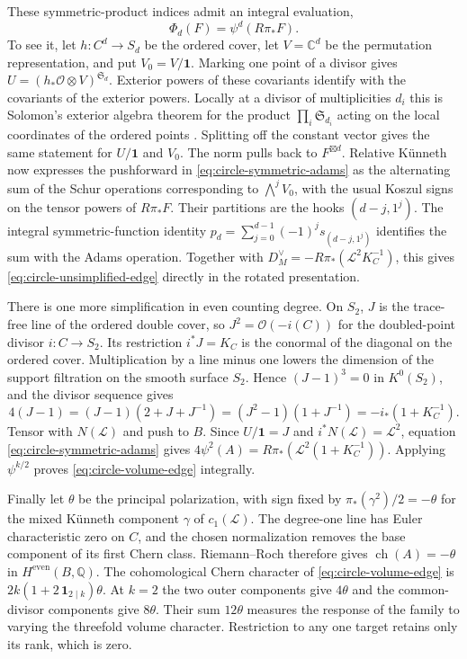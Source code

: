 These symmetric-product indices admit an integral evaluation,
\begin{equation}
 \Phi_d(F)=\psi^d(R\pi_*F).
 \label{eq:circle-symmetric-adams}
\end{equation}
To see it, let \(h:C^d\to S_d\) be the ordered cover, let
\(V=\mathbb C^d\) be the permutation representation, and put
\(V_0=V/\mathbf1\). Marking one point of a divisor gives
\(U=(h_*\mathcal O\otimes V)^{\mathfrak S_d}\).
Exterior powers of these covariants identify with the covariants of
the exterior powers. Locally at a divisor of multiplicities \(d_i\)
this is Solomon's exterior algebra theorem for the product
\(\prod_i\mathfrak S_{d_i}\) acting on the local coordinates of the
ordered points \cite{solomon}. Splitting off the constant vector
gives the same statement for \(U/\mathbf1\) and \(V_0\).
The norm pulls back to \(F^{\boxtimes d}\). Relative K\"unneth now
expresses the pushforward in \eqref{eq:circle-symmetric-adams}
as the alternating sum of the Schur operations corresponding to
\(\bigwedge^jV_0\), with the usual Koszul signs on the tensor powers
of \(R\pi_*F\). Their partitions are the hooks \((d-j,1^j)\).
The integral symmetric-function identity
\(p_d=\sum_{j=0}^{d-1}(-1)^j s_{(d-j,1^j)}\)
identifies the sum with the Adams operation. Together with
\(D_M^\vee=-R\pi_*(\mathcal L^2K_C^{-1})\), this gives
\eqref{eq:circle-unsimplified-edge} directly in the rotated
presentation.

There is one more simplification in even counting degree. On
\(S_2\), \(J\) is the trace-free line of the ordered double cover,
so \(J^2=\mathcal O(-i(C))\) for the doubled-point divisor
\(i:C\to S_2\). Its restriction \(i^*J=K_C\) is the conormal
of the diagonal on the ordered cover. Multiplication by a line
minus one lowers the dimension of the support filtration on the
smooth surface \(S_2\). Hence \((J-1)^3=0\) in \(K^0(S_2)\), and
the divisor sequence gives
\[
 4(J-1)=(J-1)(2+J+J^{-1})
        =(J^2-1)(1+J^{-1})=-i_*(1+K_C^{-1}).
\]
Tensor with \(N(\mathcal L)\) and push to \(B\). Since \(U/\mathbf1=J\)
and \(i^*N(\mathcal L)=\mathcal L^2\), equation
\eqref{eq:circle-symmetric-adams} gives
\(4\psi^2(A)=R\pi_*(\mathcal L^2(1+K_C^{-1}))\).
Applying \(\psi^{k/2}\) proves \eqref{eq:circle-volume-edge}
integrally.

Finally let \(\theta\) be the principal polarization, with sign
fixed by \(\pi_*(\gamma^2)/2=-\theta\) for the mixed K\"unneth
component \(\gamma\) of \(c_1(\mathcal L)\). The degree-one line has
Euler characteristic zero on \(C\), and the chosen normalization
removes the base component of its first Chern class. Riemann--Roch
therefore gives \(\operatorname{ch}(A)=-\theta\) in \(H^{\mathrm{even}}(B,\mathbb Q)\). The cohomological Chern
character of \eqref{eq:circle-volume-edge} is
\(2k(1+2\,\mathbf1_{2\mid k})\theta\). At \(k=2\) the two outer
components give \(4\theta\) and the common-divisor components give
\(8\theta\). Their sum \(12\theta\) measures the response of the
family to varying the threefold volume character. Restriction to
any one target retains only its rank, which is zero.
